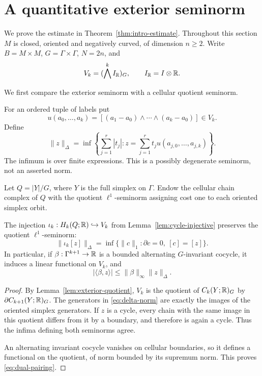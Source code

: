 \section{A quantitative exterior seminorm}
\label{sec:seminorm}

We prove the estimate in Theorem~\ref{thm:intro-estimate}.
Throughout this section $M$ is closed, oriented and negatively
curved, of dimension $n\geq2$. Write $B=M\times M$,
$G=\Gamma\times\Gamma$, $N=2n$, and
\[
 V_k=(\bigwedge^k I_{\mathbb{R}})_G,\qquad I_{\mathbb{R}}=I\otimes\mathbb{R}.
\]

We first compare the exterior seminorm with a cellular quotient seminorm.

For an ordered tuple of labels put
\[
 u(a_0,\ldots,a_k)
 =[(a_1-a_0)\wedge\cdots\wedge(a_k-a_0)]
 \in V_k.
\]
Define
\begin{equation}\label{eq:delta-norm}
 \|z\|_\Delta=
 \inf\left\{\sum_{j=1}^{r}|t_j|:
 z=\sum_{j=1}^{r}t_j
    u(a_{j,0},\ldots,a_{j,k})\right\}.
\end{equation}
The infimum is over finite expressions. This is a
possibly degenerate seminorm, not an asserted norm.

Let $Q=|Y|/G$, where $Y$ is the full simplex on
$\Gamma$. Endow the cellular chain complex of
$Q$ with the quotient $\ell^1$-seminorm assigning
cost one to each oriented simplex orbit.

\begin{lemma}\label{lem:isometric-image}
The injection
$\iota_k:H_k(Q;\mathbb{R})\hookrightarrow V_k$
from Lemma~\ref{lem:cycle-injective} preserves
the quotient $\ell^1$-seminorm:
\[
 \|\iota_k[z]\|_\Delta
 =\inf\{\|c\|_1:\partial c=0,\ [c]=[z]\}.
\]
In particular, if $\beta:\Gamma^{k+1}\to\mathbb{R}$
is a bounded alternating $G$-invariant cocycle,
it induces a linear functional on $V_k$, and
\begin{equation}\label{eq:dual-pairing}
 |\langle\beta,z\rangle|
 \leq\|\beta\|_\infty\|z\|_\Delta.
\end{equation}
\end{lemma}

\begin{proof}
By Lemma~\ref{lem:exterior-quotient},
$V_k$ is the quotient of $C_k(Y;\mathbb{R})_G$
by $\partial C_{k+1}(Y;\mathbb{R})_G$. The generators
in \eqref{eq:delta-norm} are exactly the
images of the oriented simplex generators.
If $z$ is a cycle, every chain with the same
image in this quotient differs from it by a
boundary, and therefore is again a cycle.
Thus the infima defining both seminorms agree.

An alternating invariant cocycle vanishes
on cellular boundaries, so it defines a
functional on the quotient, of norm bounded
by its supremum norm. This proves
\eqref{eq:dual-pairing}.
\end{proof}

